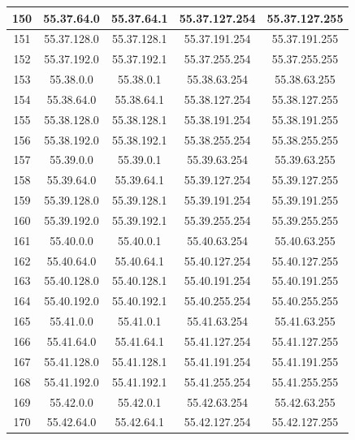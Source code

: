 \documentclass[letterpaper,12pt]{article}
\begin{document}
\begin{center}
\begin{longtable}{|c|c|c|c|c|}
                150 & 55.37.64.0 & 55.37.64.1 & 55.37.127.254 & 55.37.127.255 \\ \hline
                151 & 55.37.128.0 & 55.37.128.1 & 55.37.191.254 & 55.37.191.255 \\ \hline
                152 & 55.37.192.0 & 55.37.192.1 & 55.37.255.254 & 55.37.255.255 \\ \hline
                153 & 55.38.0.0 & 55.38.0.1 & 55.38.63.254 & 55.38.63.255 \\ \hline
                154 & 55.38.64.0 & 55.38.64.1 & 55.38.127.254 & 55.38.127.255 \\ \hline
                155 & 55.38.128.0 & 55.38.128.1 & 55.38.191.254 & 55.38.191.255 \\ \hline
                156 & 55.38.192.0 & 55.38.192.1 & 55.38.255.254 & 55.38.255.255 \\ \hline
                157 & 55.39.0.0 & 55.39.0.1 & 55.39.63.254 & 55.39.63.255 \\ \hline
                158 & 55.39.64.0 & 55.39.64.1 & 55.39.127.254 & 55.39.127.255 \\ \hline
                159 & 55.39.128.0 & 55.39.128.1 & 55.39.191.254 & 55.39.191.255 \\ \hline
                160 & 55.39.192.0 & 55.39.192.1 & 55.39.255.254 & 55.39.255.255 \\ \hline
                161 & 55.40.0.0 & 55.40.0.1 & 55.40.63.254 & 55.40.63.255 \\ \hline
                162 & 55.40.64.0 & 55.40.64.1 & 55.40.127.254 & 55.40.127.255 \\ \hline
                163 & 55.40.128.0 & 55.40.128.1 & 55.40.191.254 & 55.40.191.255 \\ \hline
                164 & 55.40.192.0 & 55.40.192.1 & 55.40.255.254 & 55.40.255.255 \\ \hline
                165 & 55.41.0.0 & 55.41.0.1 & 55.41.63.254 & 55.41.63.255 \\ \hline
                166 & 55.41.64.0 & 55.41.64.1 & 55.41.127.254 & 55.41.127.255 \\ \hline
                167 & 55.41.128.0 & 55.41.128.1 & 55.41.191.254 & 55.41.191.255 \\ \hline
                168 & 55.41.192.0 & 55.41.192.1 & 55.41.255.254 & 55.41.255.255 \\ \hline
                169 & 55.42.0.0 & 55.42.0.1 & 55.42.63.254 & 55.42.63.255 \\ \hline
                170 & 55.42.64.0 & 55.42.64.1 & 55.42.127.254 & 55.42.127.255 \\ \hline

\end{longtable}
\end{center}
\end{document}
